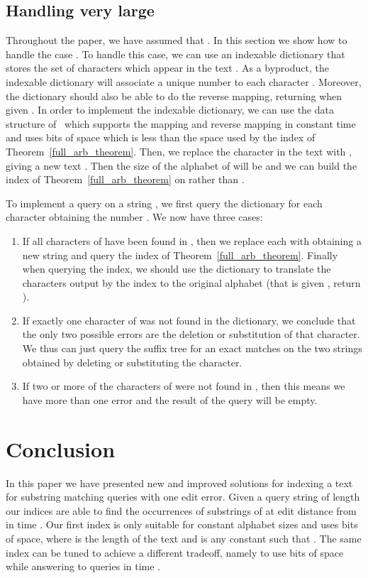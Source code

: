 \documentclass{article}
\newcommand{\?}{\mskip1.5mu}
\begin{document}
\subsection{Handling very large }
Throughout the paper, we have assumed that . In this section we show how to handle the case . To handle this case, we can use an indexable dictionary  that stores the set  of characters which appear in the text . As a byproduct, the indexable dictionary will associate a unique number  to each character . Moreover, the dictionary should also be able to do the reverse mapping, returning  when given . 
In order to implement the indexable dictionary, we can use the data structure of~\cite{RRS07} which supports the mapping and reverse mapping in constant time and uses  bits of space which is less than the space used by the index of Theorem~\ref{full_arb_theorem}. 
Then, we replace the character  in the text  with , giving a new text . Then the size of the alphabet of  will be  and we can build the index of Theorem~\ref{full_arb_theorem} on  rather than . 

To implement a query on a string , we first query the dictionary  for each character  obtaining the number . We now have three cases:
\begin{enumerate}
\item If all characters of  have been found in , then we replace each  with  obtaining a new string  and query the index of Theorem~\ref{full_arb_theorem}. 
Finally when querying the index, we should use the dictionary  to translate the characters output by the index to the original alphabet (that is given , return ). 
\item If exactly one character of  was not found in the dictionary, we conclude that the only two possible errors are the deletion or substitution of that character. We thus can just query the suffix tree for an exact matches on the two strings obtained by deleting or substituting the character. 
\item If two or more of the characters of  were not found in , then this means we have more than one error and the result of the query will be empty. 
\end{enumerate}




\section{Conclusion}
\label{section:conclusion}
In this paper we have presented new and improved solutions for indexing a text  for substring matching queries with one edit error. 
Given a query string  of length  our indices are able to find the  occurrences of substrings of  at edit distance  from  in time . Our first index is only suitable for constant alphabet sizes and uses   bits of space, where  is the length of the text  and  is any constant such that . The same index can be tuned to achieve a different tradeoff, namely to use  bits of space while answering to queries in time . 
\end{document}
